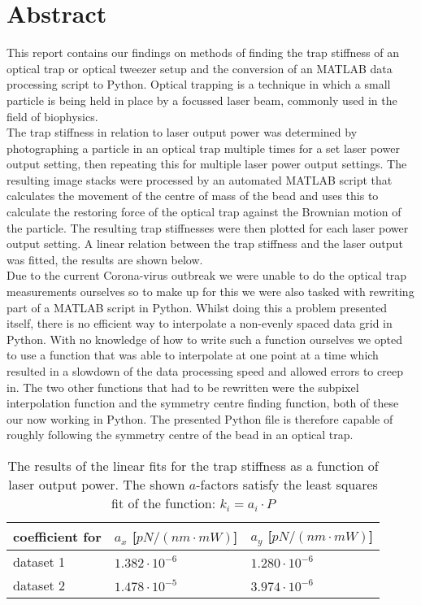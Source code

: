 \section{Abstract}
This report contains our findings on methods of finding the trap stiffness of an optical trap or optical tweezer setup and the conversion of an MATLAB data processing script to Python. Optical trapping is a technique in which a small particle is being held in place by a focussed laser beam, commonly used in the field of biophysics.\\
The trap stiffness in relation to laser output power was determined by photographing a particle in an optical trap multiple times for a set laser power output setting, then repeating this for multiple laser power output settings. The resulting image stacks were processed by an automated MATLAB script that calculates the movement of the centre of mass of the bead and uses this to calculate the restoring force of the optical trap against the Brownian motion of the particle. The resulting trap stiffnesses were then plotted for each laser power output setting. A linear relation between the trap stiffness and the laser output was fitted, the results are shown below.\\
Due to the current Corona-virus outbreak we were unable to do the optical trap measurements ourselves so to make up for this we were also tasked with rewriting part of a MATLAB script in Python. Whilst doing this a problem presented itself, there is no efficient way to interpolate a non-evenly spaced data grid in Python. With no knowledge of how to write such a function ourselves we opted to use a function that was able to interpolate at one point at a time which resulted in a slowdown of the data processing speed and allowed errors to creep in. The two other functions that had to be rewritten were the subpixel interpolation function and the symmetry centre finding function, both of these our now working in Python. The presented Python file is therefore capable of roughly following the symmetry centre of the bead in an optical trap.\\


\begin{table}[h!]
    \centering
    \begin{tabular}{|l|l|l|}
        \hline
        coefficient for & $a_x$ {[}$pN/(nm\cdot mW)${]} & $a_y$ {[}$pN/(nm \cdot mW)${]}\\ \hline
        dataset 1       & $1.382\cdot 10^{-6}$          & $1.280 \cdot 10^{-6}$\\ \hline
        dataset 2       & $1.478 \cdot 10^{-5}$         & $3.974 \cdot 10^{-6}$\\ \hline
    \end{tabular}
    \caption{The results of the linear fits for the trap stiffness as a function of laser output power. The shown $a$-factors satisfy the least squares fit of the function: $k_i = a_i \cdot P$ }
\end{table}